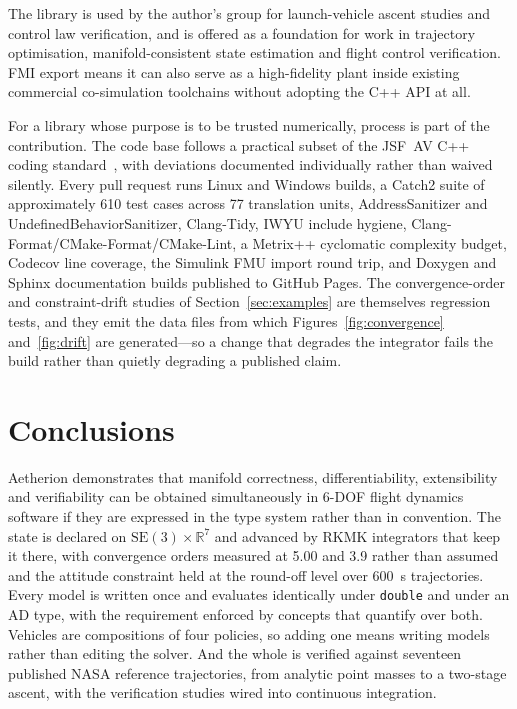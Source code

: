 \documentclass[preprint,12pt,a4paper]{elsarticle}
\newcommand{\SE}{\mathrm{SE}(3)}
\newcommand{\R}{\mathbb{R}}
\newcommand{\code}[1]{\texttt{\small #1}}
\begin{document}
The library is used by the author's group for launch-vehicle ascent studies and
control law verification, and is offered as a foundation for work in trajectory
optimisation, manifold-consistent state estimation and flight control
verification. FMI export means it can also serve as a high-fidelity plant
inside existing commercial co-simulation toolchains without adopting the C++
API at all.

For a library whose purpose is to be trusted numerically, process is part of
the contribution. The code base follows a practical subset of the JSF~AV C++
coding standard~\cite{jsfav2005}, with deviations documented individually
rather than waived silently. Every pull request runs Linux and Windows builds,
a Catch2 suite of approximately \num{610} test cases across 77 translation
units, AddressSanitizer and UndefinedBehaviorSanitizer, Clang-Tidy, IWYU
include hygiene, Clang-Format/CMake-Format/CMake-Lint, a Metrix++ cyclomatic
complexity budget, Codecov line coverage, the Simulink FMU import round trip,
and Doxygen and Sphinx documentation builds published to GitHub Pages. The
convergence-order and constraint-drift studies of Section~\ref{sec:examples}
are themselves regression tests, and they emit the data files from which
Figures~\ref{fig:convergence} and~\ref{fig:drift} are generated---so a change
that degrades the
integrator fails the build rather than quietly degrading a published claim.

\section{Conclusions}
\label{sec:conclusions}

Aetherion demonstrates that manifold correctness, differentiability,
extensibility and verifiability can be obtained simultaneously in 6-DOF flight
dynamics software if they are expressed in the type system rather than in
convention. The state is declared on $\SE \times \R^{7}$ and advanced by RKMK
integrators that keep it there, with convergence orders measured at 5.00 and
3.9 rather than assumed and the attitude constraint held at the round-off level
over \SI{600}{\second} trajectories. Every model is written once and evaluates
identically under \code{double} and under an AD type, with the requirement
enforced by concepts that quantify over both. Vehicles are compositions of four
policies, so adding one means writing models rather than editing the solver.
And the whole is verified against seventeen published NASA reference
trajectories, from analytic point masses to a two-stage ascent, with the
verification studies wired into continuous integration.
\end{document}
